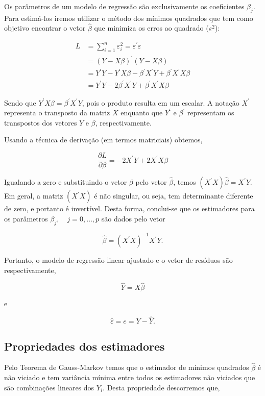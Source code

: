 \documentclass[
]{book}
\begin{document}
Os parâmetros de um modelo de regressão são exclusivamente os coeficientes \(\beta_j\). Para estimá-los iremos utilizar o método dos mínimos quadrados que tem como objetivo encontrar o vetor \(\widehat{\beta}\) que minimiza os erros ao quadrado (\(\varepsilon^2\)):

\[
\begin{aligned}
L&=\sum_{i=1}^n\varepsilon_i^2=\varepsilon^\prime \varepsilon\\
&= (Y-X\beta)^\prime (Y-X\beta)\\
&=Y^\prime Y-Y^\prime X\beta-\beta^\prime X^\prime Y+\beta^\prime X^\prime X\beta\\
&=Y^\prime Y-2\beta^\prime X^\prime Y+\beta^\prime X^\prime X\beta
\end{aligned}
\]

Sendo que \(Y^\prime X\beta=\beta^\prime X^\prime Y\), pois o produto resulta em um escalar. A notação \(X^\prime\) representa o transposto da matriz \(X\) enquanto que \(Y^\prime\) e \(\beta^\prime\) representam os transpostos dos vetores \(Y\) e \(\beta\), respectivamente.

Usando a técnica de derivação (em termos matriciais) obtemos,

\[\dfrac{\partial L}{\partial\beta}=-2X^\prime Y+2X^\prime X\beta\]

Igualando a zero e substituindo o vetor \(\beta\) pelo vetor \(\widehat{\beta}\), temos \((X^\prime X)\widehat{\beta}=X^\prime Y\). Em geral, a matriz \((X^\prime X)\) é não singular, ou seja, tem determinante diferente de zero, e portanto é invertível. Desta forma, conclui-se que os estimadores para os parâmetros \(\beta_j,\quad j=0,\dots,p\) são dados pelo vetor

\[\widehat{\beta}=(X^\prime X)^{-1} X^\prime Y.\]

Portanto, o modelo de regressão linear ajustado e o vetor de resíduos são respectivamente,

\[\widehat{Y}=X\widehat{\beta}\]

e

\[\hat\varepsilon=e=Y-\widehat{Y}.\]

\hypertarget{propriedades-dos-estimadores-1}{%
\subsection{Propriedades dos estimadores}\label{propriedades-dos-estimadores-1}}

Pelo Teorema de Gauss-Markov temos que o estimador de mínimos quadrados \(\widehat{\beta}\) é não viciado e tem variância mínima entre todos os estimadores não viciados que são combinações lineares dos \(Y_i\). Desta propriedade descorremos que,
\end{document}
